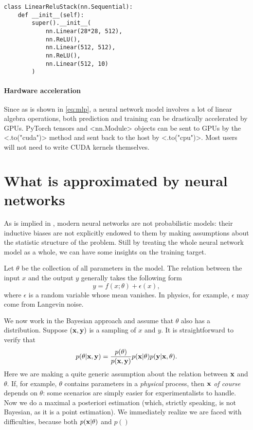 \documentclass[hyperref, a4paper, 12pt]{report}
\def\texttt#1{<#1>}%
\newcommand{\shortcode}[1]{\texttt{#1}}
\begin{document}
\begin{lstlisting}
class LinearReluStack(nn.Sequential):
    def __init__(self):
        super().__init__(
            nn.Linear(28*28, 512),
            nn.ReLU(),
            nn.Linear(512, 512),
            nn.ReLU(),
            nn.Linear(512, 10)
        )
\end{lstlisting}

\paragraph*{Hardware acceleration}
Since as is shown in \eqref{eq:mlp}, a neural network model involves a lot of linear algebra operations,
both prediction and training can be drastically accelerated by GPUs.
PyTorch tensors and \shortcode{nn.Module} objects can be sent to GPUs
by the \shortcode{.to("cuda")} method and sent back to the host by \shortcode{.to("cpu")}.
Most users will not need to write CUDA kernels themselves.

\section{What is approximated by neural networks}

As is implied in ,
modern neural networks are not probabilistic models:
their inductive biases are not explicitly endowed to them by making assumptions about the statistic structure of the problem.
Still by treating the whole neural network model as a whole,
we can have some insights on the training target. 

Let $\theta$ be the collection of all parameters in the model.
The relation between the input $x$ and the output $y$ generally takes the following form
\begin{equation}
    y = f(x; \theta) + \epsilon(x),
\end{equation}
where $\epsilon$ is a random variable whose mean vanishes.
In physics, for example, $\epsilon$ may come from Langevin noise.

We now work in the Bayesian approach and assume that $\theta$ also has a distribution.
Suppose $(\vb{x}, \vb{y})$ is a sampling of $x$ and $y$.
It is straightforward to verify that 
\begin{equation}
    p(\theta | \vb{x}, \vb{y}) = \frac{p(\theta)}{p(\vb{x}, \vb{y})} p(\vb{x} | \theta) p(\vb{y} | \vb{x}, \theta).
\end{equation}
Here we are making a quite generic assumption about the relation between $\vb{x}$ and $\theta$.
If, for example, $\theta$ contains parameters in a \emph{physical} process,
then $\vb{x}$ \emph{of course} depends on $\theta$:
some scenarios are simply easier for experimentalists to handle.
Now we do a maximal a posteriori estimation (which, strictly speaking, is not Bayesian, as it is a point estimation).
We immediately realize we are faced with difficulties,
because both $p(\vb{x} | \theta)$ and $p()$
\end{document}
